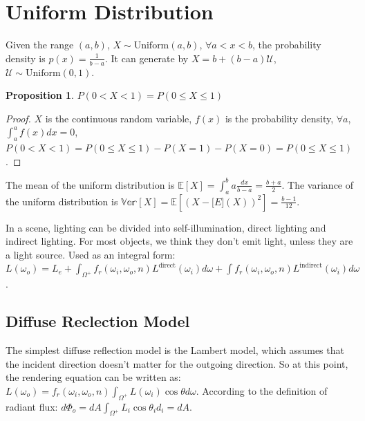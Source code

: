 \documentclass[10pt,a4paper]{article}
\newtheorem{proposition}[theorem]{Proposition}
\begin{document}
\section{Uniform Distribution}
Given the range $(a,b)$, $X\sim\text{Uniform}(a,b)$, $\forall a<x<b$, the probability density is $p(x)=\frac{1}{b-a}$.
It can generate by $X=b+(b-a)\mathcal{U}$,$\mathcal{U}\sim\text{Uniform}(0,1)$.
\begin{proposition}
    $P(0<X<1)=P(0\le X\le1)$
\end{proposition}
\begin{proof}
    $X$ is the continuous random variable, $f(x)$ is the probability density, $\forall a$,
    $\int_{a}^af(x)dx=0$,$P(0<X<1)=P(0\le X\le1)-P(X=1)-P(X=0)=P(0\le X\le1)$.
\end{proof}
The mean of the uniform distribution is $\mathbb{E}[X]=\int_{a}^{b}a\frac{dx}{b-a}=\frac{b+a}{2}$.
The variance of the uniform distribution is $\mathbb{Var}[X]=\mathbb{E}[(X-\mathbb[E](X))^2]=\frac{b-1}{12}$.

In a scene, lighting can be divided into self-illumination, direct lighting and indirect lighting. For most objects, we think they don't
emit light, unless they are a light source. Used as an integral form: $L(\omega_o)=L_e+\int_{\Omega^+}f_r(\omega_i,\omega_o,n)L^{\text{direct}}(\omega_i)d\omega+\int f_r(\omega_i,\omega_o,n)L^{\text{indirect}}(\omega_i)d\omega$.

\subsection{Diffuse Reclection Model}
The simplest diffuse reflection model is the Lambert model, which assumes that the incident direction doesn't matter for the outgoing direction.
So at this point, the rendering equation can be written as: $L(\omega_o)=f_r(\omega_i,\omega_o,n)\int_{\Omega^+}L(\omega_i)\cos\theta d\omega$.
According to the definition of radiant flux: $d\Phi_o=dA\int_{\Omega^+}L_i\cos\theta_i d_i=dA$.
\end{document}

